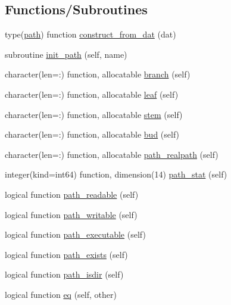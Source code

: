 \subsection*{Functions/\+Subroutines}
\begin{DoxyCompactItemize}
\item 
type(\mbox{\hyperlink{structm__path_1_1path}{path}}) function \mbox{\hyperlink{namespacem__path_ae223f8623f7a985d4349e08bc7540d53}{construct\+\_\+from\+\_\+dat}} (dat)
\item 
subroutine \mbox{\hyperlink{namespacem__path_ad3027220a3a7decb9dd35ddb41a91250}{init\+\_\+path}} (self, name)
\item 
character(len=\+:) function, allocatable \mbox{\hyperlink{namespacem__path_a33fc3c25b98c7441f230b91ddc9c40ad}{branch}} (self)
\item 
character(len=\+:) function, allocatable \mbox{\hyperlink{namespacem__path_a162b776783f42fc4fe2d3a1b951a1172}{leaf}} (self)
\item 
character(len=\+:) function, allocatable \mbox{\hyperlink{namespacem__path_ac0be359b3514ee777302195a99e583c7}{stem}} (self)
\item 
character(len=\+:) function, allocatable \mbox{\hyperlink{namespacem__path_abd678716fe9c893161b30bc80a466097}{bud}} (self)
\item 
character(len=\+:) function, allocatable \mbox{\hyperlink{namespacem__path_a54bcb3564054f6540a65dc32354f2a2d}{path\+\_\+realpath}} (self)
\item 
integer(kind=int64) function, dimension(14) \mbox{\hyperlink{namespacem__path_a44b09269412e4291dce9ce87de5f6d8f}{path\+\_\+stat}} (self)
\item 
logical function \mbox{\hyperlink{namespacem__path_a9e5b51fcb0d98f8a711b9bfbcaa39c66}{path\+\_\+readable}} (self)
\item 
logical function \mbox{\hyperlink{namespacem__path_a27ad0b81b3aedd309035fe3dc4d69128}{path\+\_\+writable}} (self)
\item 
logical function \mbox{\hyperlink{namespacem__path_abcf12fcdc2f3d90663783ff774b25261}{path\+\_\+executable}} (self)
\item 
logical function \mbox{\hyperlink{namespacem__path_a1d3741add7dd7d180b71295c4a1761c6}{path\+\_\+exists}} (self)
\item 
logical function \mbox{\hyperlink{namespacem__path_a4e56f4f3db67378cb4f20340a14f4a0f}{path\+\_\+isdir}} (self)
\item 
logical function \mbox{\hyperlink{namespacem__path_ac073eb26c4277f48777df68b8e2dfcfd}{eq}} (self, other)
\end{DoxyCompactItemize}



